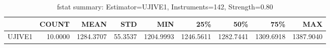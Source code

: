 \begin{table}[ht]
\centering
\caption{fstat summary: Estimator=UJIVE1, Instruments=142, Strength=0.80}
\begin{tabular}{lrrrrrrrr}
\toprule
 & COUNT & MEAN & STD & MIN & 25\% & 50\% & 75\% & MAX \\
\midrule
UJIVE1 & 10.0000 & 1284.3707 & 55.3537 & 1204.9993 & 1246.5611 & 1282.7441 & 1309.6918 & 1387.9040 \\
\bottomrule
\end{tabular}
\end{table}
